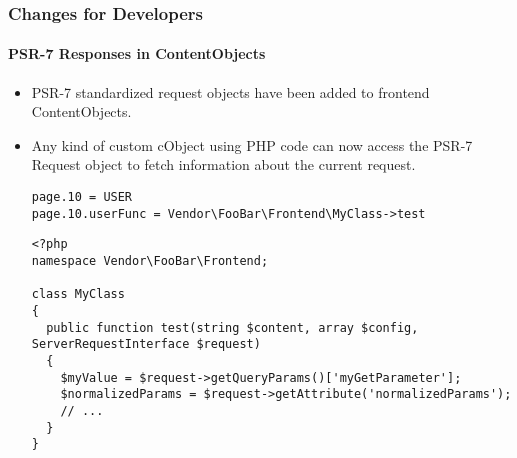 %

\begin{frame}[fragile]
	\frametitle{Changes for Developers}
	\framesubtitle{PSR-7 Responses in ContentObjects}

	\lstset{basicstyle=\tiny\ttfamily}

	\begin{itemize}
		\item PSR-7 standardized request objects have been added to frontend ContentObjects.
		\item Any kind of custom cObject using PHP code can now access the PSR-7
			Request object to fetch information about the current request.
\begin{lstlisting}
page.10 = USER
page.10.userFunc = Vendor\FooBar\Frontend\MyClass->test
\end{lstlisting}
\begin{lstlisting}
<?php
namespace Vendor\FooBar\Frontend;

class MyClass
{
  public function test(string $content, array $config, ServerRequestInterface $request)
  {
    $myValue = $request->getQueryParams()['myGetParameter'];
    $normalizedParams = $request->getAttribute('normalizedParams');
	// ...
  }
}
\end{lstlisting}

	\end{itemize}
\end{frame}

